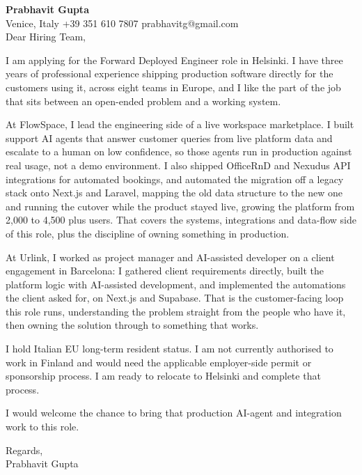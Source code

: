 \documentclass[a4paper,10.5pt]{article}
\begin{document}
\textbf{Prabhavit Gupta}\\
Venice, Italy \textbar{} +39 351 610 7807 \textbar{} prabhavitg@gmail.com\\[10pt]
Dear Hiring Team,

I am applying for the Forward Deployed Engineer role in Helsinki. I have three years of professional experience shipping production software directly for the customers using it, across eight teams in Europe, and I like the part of the job that sits between an open-ended problem and a working system.

At FlowSpace, I lead the engineering side of a live workspace marketplace. I built support AI agents that answer customer queries from live platform data and escalate to a human on low confidence, so those agents run in production against real usage, not a demo environment. I also shipped OfficeRnD and Nexudus API integrations for automated bookings, and automated the migration off a legacy stack onto Next.js and Laravel, mapping the old data structure to the new one and running the cutover while the product stayed live, growing the platform from 2,000 to 4,500 plus users. That covers the systems, integrations and data-flow side of this role, plus the discipline of owning something in production.

At Urlink, I worked as project manager and AI-assisted developer on a client engagement in Barcelona: I gathered client requirements directly, built the platform logic with AI-assisted development, and implemented the automations the client asked for, on Next.js and Supabase. That is the customer-facing loop this role runs, understanding the problem straight from the people who have it, then owning the solution through to something that works.

I hold Italian EU long-term resident status. I am not currently authorised to work in Finland and would need the applicable employer-side permit or sponsorship process. I am ready to relocate to Helsinki and complete that process.

I would welcome the chance to bring that production AI-agent and integration work to this role.

Regards,\\
Prabhavit Gupta
\end{document}
